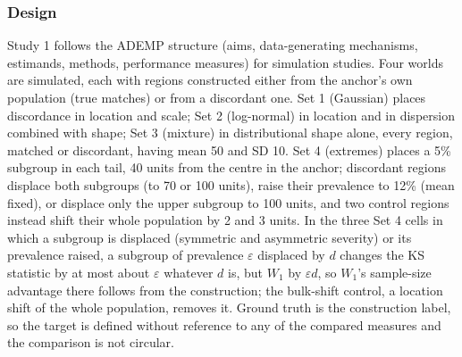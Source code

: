 \documentclass[AMA,Times1COL]{WileyNJDv5}
\begin{document}
\subsubsection{Design}\label{sec:study1_design}

Study 1 follows the ADEMP structure (aims, data-generating mechanisms, estimands, methods, performance measures) for simulation studies.\cite{morris2019} Four worlds are simulated, each with regions constructed either from the anchor's own population (true matches) or from a discordant one. Set 1 (Gaussian) places discordance in location and scale; Set 2 (log-normal) in location and in dispersion combined with shape; Set 3 (mixture) in distributional shape alone, every region, matched or discordant, having mean 50 and SD 10. Set 4 (extremes) places a 5\% subgroup in each tail, 40 units from the centre in the anchor; discordant regions displace both subgroups (to 70 or 100 units), raise their prevalence to 12\% (mean fixed), or displace only the upper subgroup to 100 units, and two control regions instead shift their whole population by 2 and 3 units. In the three Set 4 cells in which a subgroup is displaced (symmetric and asymmetric severity) or its prevalence raised, a subgroup of prevalence $\varepsilon$ displaced by $d$ changes the KS statistic by at most about $\varepsilon$ whatever $d$ is, but $W_1$ by $\varepsilon d$, so $W_1$'s sample-size advantage there follows from the construction; the bulk-shift control, a location shift of the whole population, removes it. Ground truth is the construction label, so the target is defined without reference to any of the compared measures and the comparison is not circular.
\end{document}
